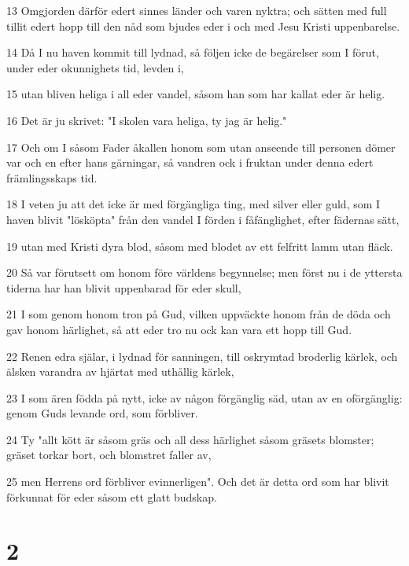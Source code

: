 \par 13 Omgjorden därför edert sinnes länder och varen nyktra; och sätten med full tillit edert hopp till den nåd som bjudes eder i och med Jesu Kristi uppenbarelse.
\par 14 Då I nu haven kommit till lydnad, så följen icke de begärelser som I förut, under eder okunnighets tid, levden i,
\par 15 utan bliven heliga i all eder vandel, såsom han som har kallat eder är helig.
\par 16 Det är ju skrivet: "I skolen vara heliga, ty jag är helig."
\par 17 Och om I såsom Fader åkallen honom som utan anseende till personen dömer var och en efter hans gärningar, så vandren ock i fruktan under denna edert främlingsskaps tid.
\par 18 I veten ju att det icke är med förgängliga ting, med silver eller guld, som I haven blivit "lösköpta" från den vandel I förden i fåfänglighet, efter fädernas sätt,
\par 19 utan med Kristi dyra blod, såsom med blodet av ett felfritt lamm utan fläck.
\par 20 Så var förutsett om honom före världens begynnelse; men först nu i de yttersta tiderna har han blivit uppenbarad för eder skull,
\par 21 I som genom honom tron på Gud, vilken uppväckte honom från de döda och gav honom härlighet, så att eder tro nu ock kan vara ett hopp till Gud.
\par 22 Renen edra själar, i lydnad för sanningen, till oskrymtad broderlig kärlek, och älsken varandra av hjärtat med uthållig kärlek,
\par 23 I som ären födda på nytt, icke av någon förgänglig säd, utan av en oförgänglig: genom Guds levande ord, som förbliver.
\par 24 Ty "allt kött är såsom gräs och all dess härlighet såsom gräsets blomster; gräset torkar bort, och blomstret faller av,
\par 25 men Herrens ord förbliver evinnerligen". Och det är detta ord som har blivit förkunnat för eder såsom ett glatt budskap.

\chapter{2}

